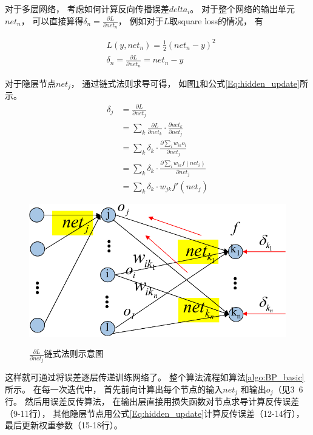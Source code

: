 对于多层网络， 考虑如何计算反向传播误差$delta_{i}$。 对于整个网络的输出单元$net_n$， 可以直接算得$\delta_n = \frac{\partial L}{\partial net_n}$， 例如对于$L$取square loss的情况， 有


\begin{equation}
\begin{split}
&	L(y,net_n)=\frac{1}{2}(net_n-y)^2 \\
&	\delta_n = \frac{\partial L}{\partial net_n} = net_n - y
\end{split}
\end{equation}


对于隐层节点$net_j$， 通过链式法则求导可得， 如图\ref{fig:update_weight_2}和公式\ref{Eq:hidden_update}所示。 
\begin{equation}\label{Eq:hidden_update}
\begin{split}
\delta_j
	&=\frac{\partial L}{\partial net_j}\\
	&=\sum_{k}\frac{\partial L}{\partial net_k}\cdot \frac{\partial net_k}{\partial net_j}\\
	&=\sum_k \delta_{k} \cdot \frac{\partial \sum_i{w_{ik}o_i}}{\partial net_j}\\
	&=\sum_k \delta_{k} \cdot \frac{\partial \sum_i{w_{ik}f(net_i)}}{\partial net_j}\\
	&=\sum_k \delta_{k} \cdot w_{jk} f'(net_j)
\end{split}
\end{equation}

\begin{figure}[htb]
  \centering
  \includegraphics[scale=0.8]{Pictures/CNN/weight_update_2-crop.pdf}\\
  \caption{$\frac{\partial L}{\partial net_j}$链式法则示意图}\label{fig:update_weight_2}
\end{figure}

这样就可通过将误差逐层传递训练网络了。 整个算法流程如算法\ref{algo:BP_basic}所示。 在每一次迭代中， 首先前向计算出每个节点的输入$net_j$ 和输出$o_j$（见3~6行。 然后用误差反传算法， 在输出层直接用损失函数对节点求导计算反传误差（9-11行）， 其他隐层节点用公式\ref{Eq:hidden_update}计算反传误差（12-14行），最后更新权重参数（15-18行）。


